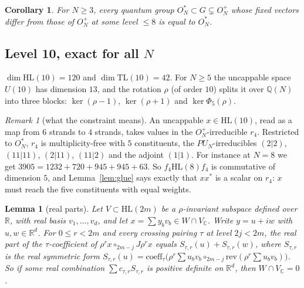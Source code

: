 \documentclass[11pt]{amsart}
\newtheorem{lemma}[theorem]{Lemma}
\newtheorem{corollary}[theorem]{Corollary}
\theoremstyle{definition}
\theoremstyle{remark}
\newtheorem{remark}[theorem]{Remark}
\theoremstyle{plain}
\numberwithin{equation}{section}
\numberwithin{table}{section}
\newcommand{\C}{\mathbb C}
\newcommand{\Q}{\mathbb Q}
\newcommand{\TL}{\mathrm{TL}}
\newcommand{\HL}{\mathrm{HL}}
\begin{document}
\begin{corollary}
For $N\ge3$, every quantum group $O_N^*\subset G\subsetneq O_N^+$ whose fixed vectors differ from those of $O_N^+$
at some level $\le8$ is equal to $O_N^*$.
\end{corollary}

\subsection{Level 10, exact for all $N$}

$\dim\HL(10)=120$ and $\dim\TL(10)=42$. For $N\ge5$ the uncappable space $U(10)$ has dimension $13$, and the rotation
$\rho$ (of order $10$) splits it over $\Q(N)$ into three blocks: $\ker(\rho-1)$, $\ker(\rho+1)$ and $\ker\Phi_5(\rho)$.

\begin{remark}[what the constraint means]
An uncappable $x\in\HL(10)$, read as a map from $6$ strands to $4$ strands, takes values in the $O_N^+$-irreducible $r_4$.
Restricted to $O_N^*$, $r_4$ is multiplicity-free with $5$ constituents, the $PU_N$-irreducibles
$(2|2)$, $(11|11)$, $(2|11)$, $(11|2)$ and the adjoint $(1|1)$. For instance at $N=8$ we get $3905=1232+720+945+945+63$.
So $f_4\HL(8)f_4$ is commutative of dimension $5$, and Lemma~\ref{lem:glue} says exactly that $xx^*$ is a scalar on $r_4$:
$x$ must reach the five constituents with equal weights.
\end{remark}

\begin{lemma}[real parts]\label{lem:realpart}
Let $V\subset\HL(2m)$ be a $\rho$-invariant subspace defined over $\mathbb R$, with real basis $v_1,\dots,v_d$, and let
$x=\sum y_bv_b\in W\cap V_\C$. Write $y=u+iw$ with $u,w\in\mathbb R^d$. For $0\le r<2m$ and every crossing pairing $\tau$ at
level $2j<2m$, the real part of the $\tau$-coefficient of $\rho^rx\circ_{2m-j}J\rho^rx$ equals $S_{\tau,r}(u)+S_{\tau,r}(w)$,
where $S_{\tau,r}$ is the real symmetric form $S_{\tau,r}(u)=\mathrm{coeff}_\tau\big(\rho^r\textstyle\sum u_bv_b\circ_{2m-j}\mathrm{rev}(\rho^r\sum u_bv_b)\big)$.
So if some real combination $\sum c_{\tau,r}S_{\tau,r}$ is positive definite on $\mathbb R^d$, then $W\cap V_\C=0$.
\end{lemma}
\end{document}
